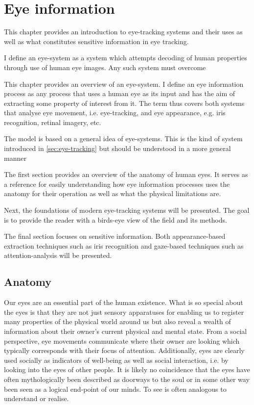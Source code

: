 \chapter{Eye information}
This chapter provides an introduction to eye-tracking systems and their uses as well as what constitutes sensitive information in eye tracking. 

I define an \gls{eye-system} as a system which attempts decoding of human properties through use of human eye images. Any such system must overcome 

This chapter provides an overview of an \gls{eye-system}. I define an eye information process as any process that uses a human eye as its input and has the aim of extracting some property of interest from it. The term thus covers both systems that analyse eye movement, i.e. eye-tracking, and eye appearance, e.g. iris recognition, retinal imagery, etc. 


The model is based on a general idea of \gls{eye-system}s. This is the kind of system introduced in \cref{sec:eye-tracking} but should be understood in a more general manner

The first section provides an overview of the anatomy of human eyes. It serves as a reference for easily understanding how eye information processes uses the anatomy for their operation as well as what the physical limitations are. 

Next, the foundations of modern eye-tracking systems will be presented. The goal is to provide the reader with a birds-eye view of the field and its methods.

The final section focuses on sensitive information. Both appearance-based extraction techniques such as iris recognition and gaze-based techniques such as attention-analysis will be presented. 


\section{Anatomy}
Our eyes are an essential part of the human existence. What is so special about the eyes is that they are not just sensory apparatuses for enabling us to register many properties of the physical world around us but also reveal a wealth of information about their owner's current physical and mental state. From a social perspective, eye movements communicate where their owner are looking which typically corresponds with their focus of attention. Additionally, eyes are clearly used socially as indicators of well-being as well as social interaction, i.e. by looking into the eyes of other people. It is likely no coincidence that the eyes have often mythologically been described as doorways to the soul or in some other way been seen as a logical end-point of our minds. To see is often analogous to understand or realise. 

